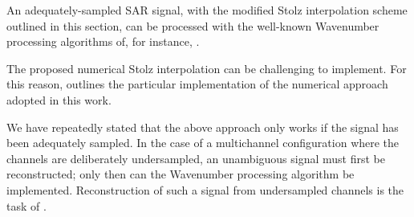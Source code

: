 An adequately-sampled SAR signal, with the modified Stolz interpolation scheme outlined in this section, can be processed with the well-known Wavenumber processing algorithms of, for instance, \cite{Bamler1992, Cumming2003, Cafforio1991a}.
\par
The proposed numerical Stolz interpolation can be challenging to implement. For this reason,  outlines the particular implementation of the numerical approach adopted in this work. 
\par
We have repeatedly stated that the above approach only works if the signal has been adequately sampled. In the case of a multichannel configuration where the channels are deliberately undersampled, an unambiguous signal must first be reconstructed; only then can the Wavenumber processing algorithm be implemented. Reconstruction of such a signal from undersampled channels is the task of .
